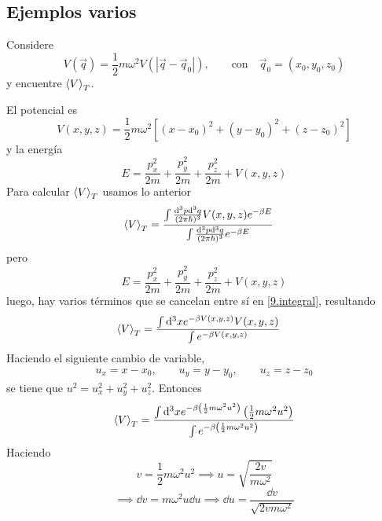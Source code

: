 \subsection{Ejemplos varios}
\begin{ej}
	Considere 
	\begin{equation}
  V(\vec{q})=\frac{1}{2}m\omega^2V(|\vec{q}-\vec{q}_0 |),\qquad \text{con}\quad \vec{q}_0=(x_0,y_0,z_0)
\end{equation}
y encuentre $\ev{V}_T$.
\end{ej}
\begin{sol}
	El potencial es
	\begin{equation}
  V(x,y,z)=\frac{1}{2}m\omega^2\left[(x-x_0)^2+(y-y_0)^2+(z-z_0)^2\right]
\end{equation}
y la energía
\begin{equation}
  E=\frac{p_x^2}{2m}+\frac{p_y^2}{2m}+\frac{p_z^2}{2m}+V(x,y,z)
\end{equation}
Para calcular $\ev{V}_T$ usamos lo anterior
\begin{align}\label{9.integral}
  \ev{V}_T&=\frac{\int\frac{\dd^3p\dd^3q}{(2\p\hbar)^3}V(x,y,z)e^{-\b E}}{\int\frac{\dd^3p\dd^3q}{(2\p \hbar)^3}e^{-\b E}}
\end{align}
pero 
\begin{equation}
  E=\frac{p_x^2}{2m}+\frac{p_y^2}{2m}+\frac{p_z^2}{2m}+V(x,y,z)
\end{equation}
luego, hay varios términos que se cancelan entre sí en \eqref{9.integral}, resultando
\begin{align}
   \ev{V}_T&=\frac{\int\dd^3x e^{-\b V(x,y,z)}V(x,y,z)}{\int e^{-\b V(x,y,z)}}
\end{align}
Haciendo el siguiente cambio de variable,
\begin{align}
  u_x=x-x_0,\qquad u_y=y-y_0,\qquad u_z=z-z_0
\end{align}
se tiene que $u^2=u_x^2+u_y^2+u_z^2$. Entonces
\begin{equation}
  \ev{V}_T=\frac{\int\dd^3x e^{-\b \left(\frac{1}{2}m\omega^2u^2\right)}\left(\frac{1}{2}m\omega^2u^2\right)}{\int e^{-\b \left(\frac{1}{2}m\omega^2u^2\right)}}
\end{equation}
Haciendo 
\begin{equation}
  v=\frac{1}{2}m\omega^2 u^2\implies u=\sqrt{\frac{2v}{m\omega^2}}
\end{equation}
\begin{equation}
  \implies \dd v=m\omega^2u\dd u\implies \dd u=\frac{\dd v}{\sqrt{2 vm\omega^2}}
\end{equation}

\end{sol}
